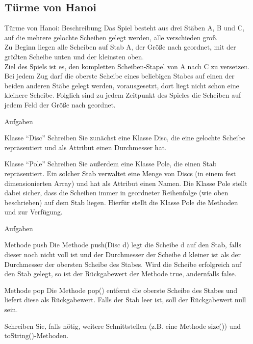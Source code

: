 \documentclass[usepdftitle=false,hyperref={pdfpagelabels=false}]{beamer}
\begin{document}
\subsection{Türme von Hanoi}
\begin{frame}{Türme von Hanoi: Beschreibung}
    Das Spiel besteht aus drei Stäben A, B und C, auf die mehrere gelochte Scheiben gelegt werden,
    alle verschieden groß.\\
    Zu Beginn liegen alle Scheiben auf Stab A, der Größe nach geordnet, mit der
    größten Scheibe unten und der kleinsten oben.\\
    Ziel des Spiels ist es, den kompletten Scheiben-Stapel
    von A nach C zu versetzen.\\
    Bei jedem Zug darf die oberste Scheibe eines beliebigen Stabes auf einen
    der beiden anderen Stäbe gelegt werden, vorausgesetzt, dort liegt nicht schon eine kleinere Scheibe.
    Folglich sind zu jedem Zeitpunkt des Spieles die Scheiben auf jedem Feld der Größe nach geordnet.
\end{frame}

\begin{frame}{Aufgaben}
    \begin{block}{Klasse "`Disc"'}
        Schreiben Sie zunächst eine Klasse Disc, die eine gelochte
        Scheibe repräsentiert und als Attribut einen Durchmesser hat.
    \end{block}

    \begin{block}{Klasse "`Pole"'}
        Schreiben Sie außerdem eine Klasse Pole, die einen Stab repräsentiert. Ein solcher Stab verwaltet eine
        Menge von Discs (in einem fest dimensionierten Array) und hat als Attribut einen Namen. Die Klasse
        Pole stellt dabei sicher, dass die Scheiben immer in geordneter Reihenfolge (wie oben beschrieben)
        auf dem Stab liegen. Hierfür stellt die Klasse Pole die Methoden
         und
         zur Verfügung.
    \end{block}
\end{frame}

\begin{frame}{Aufgaben}
    \begin{block}{Methode push}
        Die Methode push(Disc d) legt die Scheibe d auf den Stab,
        falls dieser noch nicht voll ist und
        der Durchmesser der Scheibe d kleiner ist als der Durchmesser
        der obersten Scheibe des Stabes. Wird
        die Scheibe erfolgreich auf den Stab gelegt, so ist der
        Rückgabewert der Methode true, andernfalls
        false.
    \end{block}

    \begin{block}{Methode pop}
        Die Methode pop() entfernt die oberste Scheibe des Stabes und
        liefert diese als Rückgabewert. Falls
        der Stab leer ist, soll der Rückgabewert null sein.
    \end{block}

    Schreiben Sie, falls nötig, weitere Schnittstellen
    (z.B. eine Methode size()) und toString()-Methoden.
\end{frame}
\end{document}
